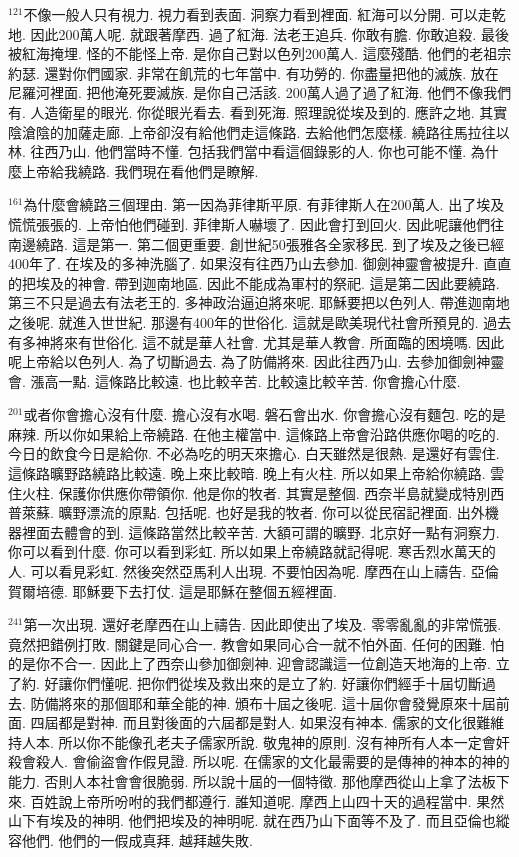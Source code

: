 \documentclass{book}
\begin{document}
$^{121}$不像一般人只有視力.
視力看到表面.
洞察力看到裡面.
紅海可以分開.
可以走乾地.
因此200萬人呢.
就跟著摩西.
過了紅海.
法老王追兵.
你敢有膽.
你敢追殺.
最後被紅海掩埋.
怪的不能怪上帝.
是你自己對以色列200萬人.
這麼殘酷.
他們的老祖宗約瑟.
還對你們國家.
非常在飢荒的七年當中.
有功勞的.
你盡量把他的滅族.
放在尼羅河裡面.
把他淹死要滅族.
是你自己活該.
200萬人過了過了紅海.
他們不像我們有.
人造衛星的眼光.
你從眼光看去.
看到死海.
照理說從埃及到的.
應許之地.
其實陰滄陰的加薩走廊.
上帝卻沒有給他們走這條路.
去給他們怎麼樣.
繞路往馬拉往以林.
往西乃山.
他們當時不懂.
包括我們當中看這個錄影的人.
你也可能不懂.
為什麼上帝給我繞路.
我們現在看他們是瞭解.

$^{161}$為什麼會繞路三個理由.
第一因為菲律斯平原.
有菲律斯人在200萬人.
出了埃及慌慌張張的.
上帝怕他們碰到.
菲律斯人嚇壞了.
因此會打到回火.
因此呢讓他們往南邊繞路.
這是第一.
第二個更重要.
創世紀50張雅各全家移民.
到了埃及之後已經400年了.
在埃及的多神洗腦了.
如果沒有往西乃山去參加.
御劍神靈會被提升.
直直的把埃及的神會.
帶到迦南地區.
因此不能成為軍村的祭祀.
這是第二因此要繞路.
第三不只是過去有法老王的.
多神政治逼迫將來呢.
耶穌要把以色列人.
帶進迦南地之後呢.
就進入世世紀.
那邊有400年的世俗化.
這就是歐美現代社會所預見的.
過去有多神將來有世俗化.
這不就是華人社會.
尤其是華人教會.
所面臨的困境嗎.
因此呢上帝給以色列人.
為了切斷過去.
為了防備將來.
因此往西乃山.
去參加御劍神靈會.
漲高一點.
這條路比較遠.
也比較辛苦.
比較遠比較辛苦.
你會擔心什麼.

$^{201}$或者你會擔心沒有什麼.
擔心沒有水喝.
磐石會出水.
你會擔心沒有麵包.
吃的是麻辣.
所以你如果給上帝繞路.
在他主權當中.
這條路上帝會沿路供應你喝的吃的.
今日的飲食今日是給你.
不必為吃的明天來擔心.
白天雖然是很熱.
是還好有雲住.
這條路曠野路繞路比較遠.
晚上來比較暗.
晚上有火柱.
所以如果上帝給你繞路.
雲住火柱.
保護你供應你帶領你.
他是你的牧者.
其實是整個.
西奈半島就變成特別西普萊蘇.
曠野漂流的原點.
包括呢.
也好是我的牧者.
你可以從民宿記裡面.
出外機器裡面去體會的到.
這條路當然比較辛苦.
大額可謂的曠野.
北京好一點有洞察力.
你可以看到什麼.
你可以看到彩虹.
所以如果上帝繞路就記得呢.
寒舌烈水萬天的人.
可以看見彩虹.
然後突然亞馬利人出現.
不要怕因為呢.
摩西在山上禱告.
亞倫賀爾培德.
耶穌要下去打仗.
這是耶穌在整個五經裡面.

$^{241}$第一次出現.
還好老摩西在山上禱告.
因此即使出了埃及.
零零亂亂的非常慌張.
竟然把錯例打敗.
關鍵是同心合一.
教會如果同心合一就不怕外面.
任何的困難.
怕的是你不合一.
因此上了西奈山參加御劍神.
迎會認識這一位創造天地海的上帝.
立了約.
好讓你們懂呢.
把你們從埃及救出來的是立了約.
好讓你們經手十屆切斷過去.
防備將來的那個耶和華全能的神.
頒布十屆之後呢.
這十屆你會發覺原來十屆前面.
四屆都是對神.
而且對後面的六屆都是對人.
如果沒有神本.
儒家的文化很難維持人本.
所以你不能像孔老夫子儒家所說.
敬鬼神的原則.
沒有神所有人本一定會奸殺會殺人.
會偷盜會作假見證.
所以呢.
在儒家的文化最需要的是傳神的神本的神的能力.
否則人本社會會很脆弱.
所以說十屆的一個特徵.
那他摩西從山上拿了法板下來.
百姓說上帝所吩咐的我們都遵行.
誰知道呢.
摩西上山四十天的過程當中.
果然山下有埃及的神明.
他們把埃及的神明呢.
就在西乃山下面等不及了.
而且亞倫也縱容他們.
他們的一假成真拜.
越拜越失敗.
\end{document}
